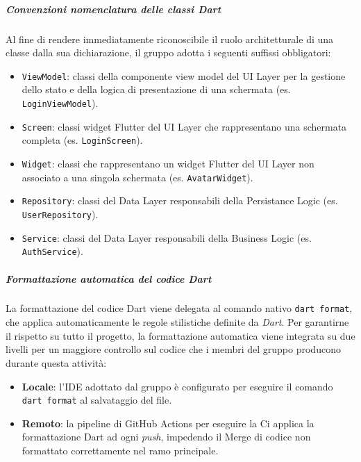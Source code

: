 \documentclass[a4paper,12pt]{article}
\begin{document}
\subparagraph{Convenzioni nomenclatura delle classi Dart}
Al fine di rendere immediatamente riconoscibile il ruolo architetturale di una classe dalla sua dichiarazione, il gruppo adotta i seguenti suffissi obbligatori:
\begin{itemize}
    \item \texttt{ViewModel}: classi della componente view model del UI Layer per la gestione dello stato e della logica di presentazione di una schermata (es. \texttt{LoginViewModel}).
    \item \texttt{Screen}: classi widget Flutter del UI Layer che rappresentano una schermata completa (es. \texttt{LoginScreen}).
    \item \texttt{Widget}: classi che rappresentano un widget Flutter del UI Layer non associato a una singola schermata (es. \texttt{AvatarWidget}).
    \item \texttt{Repository}: classi del Data Layer responsabili della Persistance Logic (es. \texttt{UserRepository}).
    \item \texttt{Service}: classi del Data Layer responsabili della Business Logic (es. \texttt{AuthService}).
\end{itemize}

\subparagraph{Formattazione automatica del codice Dart} 
La formattazione del codice Dart viene delegata al comando nativo \texttt{dart format}, che applica automaticamente le regole stilistiche definite da \textit{Dart}. 
Per garantirne il rispetto su tutto il progetto, la formattazione automatica viene integrata su due livelli per un maggiore controllo sul 
codice che i membri del gruppo producono durante questa attività:
\begin{itemize}
    \item \textbf{Locale}: l'IDE adottato dal gruppo è configurato per eseguire il comando \texttt{dart format} al salvataggio del file.
    \item \textbf{Remoto}: la pipeline di GitHub Actions per eseguire la Ci applica la formattazione Dart ad ogni \textit{push}, 
    impedendo il Merge di codice non formattato correttamente nel ramo principale.
\end{itemize}
\end{document}
